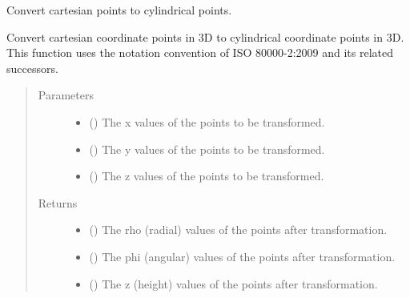 \documentclass[letterpaper,10pt,english]{sphinxmanual}
\begin{document}
\begin{fulllineitems}
\label{\detokenize{Backend.coordinate_system_transformation:Backend.coordinate_system_transformation.cartesian_to_cylindrical_3d}}
Convert cartesian points to cylindrical points.

Convert cartesian coordinate points in 3D to cylindrical coordinate points
in 3D. This function uses the notation convention of ISO 80000-2:2009 and
its related successors.
\begin{quote}\begin{description}
\item[{Parameters}] \leavevmode\begin{itemize}
\item {} 
 () \textendash{} The x values of the points to be transformed.

\item {} 
 () \textendash{} The y values of the points to be transformed.

\item {} 
 () \textendash{} The z values of the points to be transformed.

\end{itemize}

\item[{Returns}] \leavevmode
\begin{itemize}
\item {} 
 () \textendash{} The rho (radial) values of the points after transformation.

\item {} 
 () \textendash{} The phi (angular) values of the points after transformation.

\item {} 
 () \textendash{} The z (height) values of the points after transformation.

\end{itemize}


\end{description}\end{quote}

\end{fulllineitems}
\end{document}
